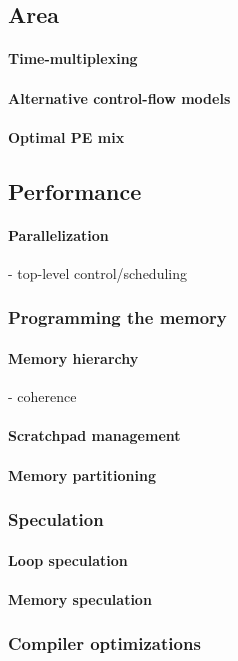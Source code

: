 	\subsection{Area}
		\paragraph{Time-multiplexing}
		\paragraph{Alternative control-flow models}
		\paragraph{Optimal PE mix}

	\subsection{Performance}
		\paragraph{Parallelization}
			- top-level control/scheduling
		\subsubsection{Programming the memory}
			\paragraph{Memory hierarchy}
				- coherence
			\paragraph{Scratchpad management}
			\paragraph{Memory partitioning}
		\subsubsection{Speculation}
			\paragraph{Loop speculation}
			\paragraph{Memory speculation}
		\subsubsection{Compiler optimizations}
